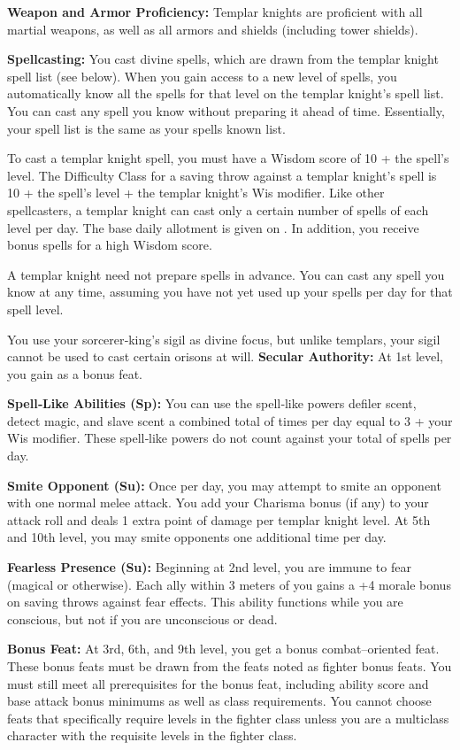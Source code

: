 {
\textbf{Weapon and Armor Proficiency:} Templar knights are proficient with all martial weapons, as well as all armors and shields (including tower shields).

\textbf{Spellcasting:} You cast divine spells, which are drawn from the templar knight spell list (see below). When you gain access to a new level of spells, you automatically know all the spells for that level on the templar knight's spell list. You can cast any spell you know without preparing it ahead of time. Essentially, your spell list is the same as your spells known list.

To cast a templar knight spell, you must have a Wisdom score of 10 + the spell's level. The Difficulty Class for a saving throw against a templar knight's spell is 10 + the spell's level + the templar knight's Wis modifier. Like other spellcasters, a templar knight can cast only a certain number of spells of each level per day. The base daily allotment is given on . In addition, you receive bonus spells for a high Wisdom score.

A templar knight need not prepare spells in advance. You can cast any spell you know at any time, assuming you have not yet used up your spells per day for that spell level.

You use your sorcerer‐king's sigil as divine focus, but unlike templars, your sigil cannot be used to cast certain orisons at will.
\textbf{Secular Authority:} At 1st level, you gain  as a bonus feat.

\textbf{Spell‐Like Abilities (Sp):} You can use the spell‐like powers defiler scent, detect magic, and slave scent a combined total of times per day equal to 3 + your Wis modifier. These spell‐like powers do not count against your total of spells per day.

\textbf{Smite Opponent (Su):} Once per day, you may attempt to smite an opponent with one normal melee attack. You add your Charisma bonus (if any) to your attack roll and deals 1 extra point of damage per templar knight level. At 5th and 10th level, you may smite opponents one additional time per day.

\textbf{Fearless Presence (Su):} Beginning at 2nd level, you are immune to fear (magical or otherwise). Each ally within 3 meters of you gains a +4 morale bonus on saving throws against fear effects. This ability functions while you are conscious, but not if you are unconscious or dead.

\textbf{Bonus Feat:} At 3rd, 6th, and 9th level, you get a bonus combat–oriented feat. These bonus feats must be drawn from the feats noted as fighter bonus feats. You must still meet all prerequisites for the bonus feat, including ability score and base attack bonus minimums as well as class requirements. You cannot choose feats that specifically require levels in the fighter class unless you are a multiclass character with the requisite levels in the fighter class.

}
